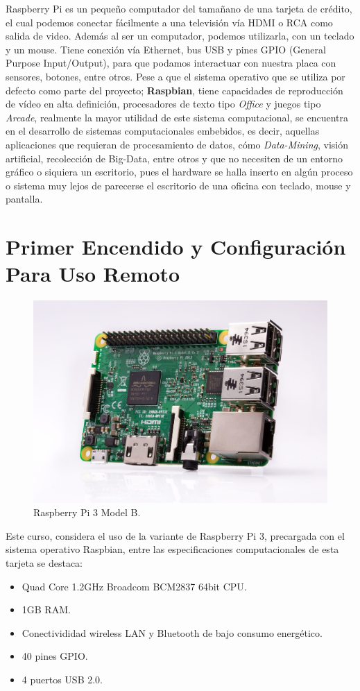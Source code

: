 \documentclass[letterpaper, 10pt]{report}
\begin{document}
Raspberry Pi es un pequeño computador del tamañano de una tarjeta de crédito, el cual podemos conectar fácilmente a una televisión vía HDMI o RCA como salida de video. Además al ser un computador, podemos utilizarla, con un teclado y un mouse. Tiene conexión vía Ethernet, bus USB y pines GPIO (General Purpose Input/Output), para que podamos interactuar con nuestra placa con sensores, botones, entre otros. Pese a que el sistema operativo que se utiliza por defecto como parte del proyecto; {\bf Raspbian}, tiene capacidades de reproducción de vídeo en alta definición, procesadores de texto tipo \emph{Office} y juegos tipo \emph{Arcade}, realmente la mayor utilidad de este sistema computacional, se encuentra en el desarrollo de sistemas computacionales embebidos, es decir, aquellas aplicaciones que requieran de procesamiento de datos, cómo \emph{Data-Mining}, visión artificial, recolección de Big-Data, entre otros y que no necesiten de un entorno gráfico o siquiera un escritorio, pues el hardware se halla inserto en algún proceso o sistema muy lejos de parecerse el escritorio de una oficina con teclado, mouse y pantalla.

\section{Primer Encendido y Configuración Para Uso Remoto}

\begin{figure}[h]
\centering
\includegraphics[scale=0.25]{pi3.jpg}
\caption{Raspberry Pi 3 Model B.\label{RPI}}
\end{figure}

Este curso, considera el uso de la variante de Raspberry Pi 3, precargada con el sistema operativo Raspbian, entre las especificaciones computacionales de esta tarjeta se destaca:
\begin{itemize}
\itemsep=0pt
	\item Quad Core 1.2GHz Broadcom BCM2837 64bit CPU.
	\item 1GB RAM.
	\item Conectivididad wireless LAN y Bluetooth de bajo consumo energético.
	\item 40 pines GPIO.
	\item 4 puertos USB 2.0.
\end{itemize}
\end{document}
